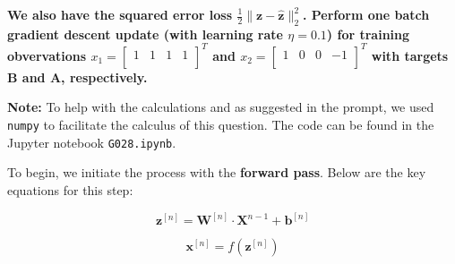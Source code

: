 \documentclass[12pt]{article}
\begin{document}
\begin{enumerate}[leftmargin=\labelsep]
          \vskip -0.5cm
          \textbf{We also have the squared error loss $\frac{1}{2} \|\mathbf{z} - \hat{\mathbf{z}}\|^{2}_{2}$. Perform one batch gradient descent update (with learning rate $\eta = 0.1$) for training
          obvervations $x_1 = \begin{bmatrix} 1 & 1 & 1 & 1 \\ \end{bmatrix}^T$ and $x_2 = \begin{bmatrix} 1 & 0 & 0 & -1 \\ \end{bmatrix}^T$ with targets B and A,
          respectively.}

          \vskip 0.3cm
          \textbf{Note:} To help with the calculations and as suggested in the prompt, we used \texttt{numpy} to facilitate the calculus of this question.
          The code can be found in the Jupyter notebook \texttt{G028.ipynb}.

          To begin, we initiate the process with the \textbf{forward pass}. Below are the key equations for this step:

            \begin{equation}\label{ex2-z}
                \mathbf{z}^{[n]} = \mathbf{W}^{[n]} \cdot \mathbf{X}^{{n-1}} + \mathbf{b}^{[n]}
            \end{equation}

            \begin{equation}\label{ex2-x}
                \mathbf{x}^{[n]} = f\left(\mathbf{z}^{[n]}\right)
            \end{equation}


\end{enumerate}
\end{document}
